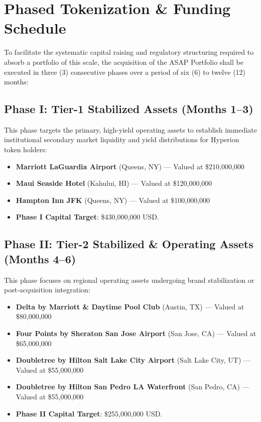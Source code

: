 \documentclass[11pt,a4paper]{article}
\begin{document}
\clearpage

\section{Phased Tokenization \& Funding Schedule}
To facilitate the systematic capital raising and regulatory structuring required to absorb a portfolio of this scale, the acquisition of the ASAP Portfolio shall be executed in three (3) consecutive phases over a period of six (6) to twelve (12) months:

\subsection{Phase I: Tier-1 Stabilized Assets (Months 1--3)}
This phase targets the primary, high-yield operating assets to establish immediate institutional secondary market liquidity and yield distributions for Hyperion token holders:
\begin{itemize}
    \item \textbf{Marriott LaGuardia Airport} (Queens, NY) --- Valued at \$210,000,000
    \item \textbf{Maui Seaside Hotel} (Kahului, HI) --- Valued at \$120,000,000
    \item \textbf{Hampton Inn JFK} (Queens, NY) --- Valued at \$100,000,000
    \item \textbf{Phase I Capital Target}: \$430,000,000 USD.
\end{itemize}

\subsection{Phase II: Tier-2 Stabilized \& Operating Assets (Months 4--6)}
This phase focuses on regional operating assets undergoing brand stabilization or post-acquisition integration:
\begin{itemize}
    \item \textbf{Delta by Marriott \& Daytime Pool Club} (Austin, TX) --- Valued at \$80,000,000
    \item \textbf{Four Points by Sheraton San Jose Airport} (San Jose, CA) --- Valued at \$65,000,000
    \item \textbf{Doubletree by Hilton Salt Lake City Airport} (Salt Lake City, UT) --- Valued at \$55,000,000
    \item \textbf{Doubletree by Hilton San Pedro LA Waterfront} (San Pedro, CA) --- Valued at \$55,000,000
    \item \textbf{Phase II Capital Target}: \$255,000,000 USD.
\end{itemize}
\end{document}
